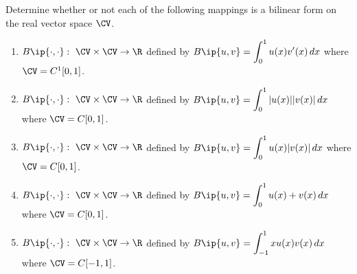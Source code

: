 
Determine whether or not each of the following mappings is a bilinear form on the real vector space $\CV$.
\\
\begin{enumerate}
\item$\displaystyle{B\ip{\cdot,\cdot}:\mbox{ }\CV\times\CV\rightarrow\R}$ defined by $\displaystyle{B\ip{u,v} = \int_0^1 u(x) v'(x)\, dx}$ where $\CV=C^1[0,1]$.
\\
\item$\displaystyle{B\ip{\cdot,\cdot}:\mbox{ }\CV\times\CV\rightarrow\R}$ defined by $\displaystyle{B\ip{u,v} = \int_0^1 |u(x)| |v(x)|\, dx}$ where $\CV=C[0,1]$.
\\
\item$\displaystyle{B\ip{\cdot,\cdot}:\mbox{ }\CV\times\CV\rightarrow\R}$ defined by $\displaystyle{B\ip{u,v} = \int_0^1 u(x) |v(x)|\, dx}$ where $\CV=C[0,1]$.
\\
\item$\displaystyle{B\ip{\cdot,\cdot}:\mbox{ }\CV\times\CV\rightarrow\R}$ defined by $\displaystyle{B\ip{u,v} = \int_0^1 u(x) + v(x)\, dx}$ where $\CV=C[0,1]$.
\\
\item$\displaystyle{B\ip{\cdot,\cdot}:\mbox{ }\CV\times\CV\rightarrow\R}$ defined by $\displaystyle{B\ip{u,v}=\int_{-1}^1xu(x)v(x)\,dx}$ where $\CV=C[-1,1]$.
\end{enumerate}




